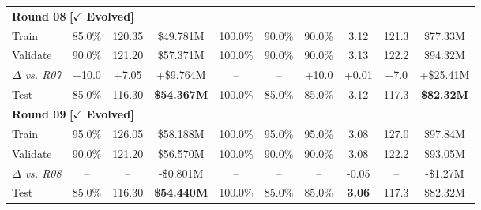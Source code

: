\begin{table}[!htb]
\begin{tabular}{l c c c c c c c c c}
\multicolumn{10}{l}{\textbf{Round 08} \textcolor{GoogleGreen!65!black}{\textbf{[$\checkmark$ Evolved]}}} \\
\quad Train                     & 85.0\% & 120.35 & \$49.781M & 100.0\% & 90.0\% & 90.0\% & 3.12 & 121.3 & \$77.33M \\
\quad Validate                  & 90.0\% & 121.20 & \$57.371M & 100.0\% & 90.0\% & 90.0\% & 3.13 & 122.2 & \$94.32M \\
\quad \quad \textcolor{black!65}{\textit{\scriptsize $\Delta$ vs. R07}} & \textcolor{GoogleGreen!65!black}{\scriptsize +10.0} & \textcolor{GoogleGreen!65!black}{\scriptsize +7.05} & \textcolor{GoogleGreen!65!black}{\scriptsize +\$9.764M} & \textcolor{black!65}{\scriptsize --} & \textcolor{black!65}{\scriptsize --} & \textcolor{GoogleGreen!65!black}{\scriptsize +10.0} & \textcolor{GoogleRed!75!black}{\scriptsize +0.01} & \textcolor{GoogleGreen!65!black}{\scriptsize +7.0} & \textcolor{GoogleGreen!65!black}{\scriptsize +\$25.41M} \\
\quad Test                      & 85.0\% & 116.30 & \textbf{\$54.367M} & 100.0\% & 85.0\% & 85.0\% & 3.12 & 117.3 & \textbf{\$82.32M} \\
\midrule

\multicolumn{10}{l}{\textbf{Round 09} \textcolor{GoogleGreen!65!black}{\textbf{[$\checkmark$ Evolved]}}} \\
\quad Train                     & 95.0\% & 126.05 & \$58.188M & 100.0\% & 95.0\% & 95.0\% & 3.08 & 127.0 & \$97.84M \\
\quad Validate                  & 90.0\% & 121.20 & \$56.570M & 100.0\% & 90.0\% & 90.0\% & 3.08 & 122.2 & \$93.05M \\
\quad \quad \textcolor{black!65}{\textit{\scriptsize $\Delta$ vs. R08}} & \textcolor{black!65}{\scriptsize --} & \textcolor{black!65}{\scriptsize --} & \textcolor{GoogleRed!75!black}{\scriptsize -\$0.801M} & \textcolor{black!65}{\scriptsize --} & \textcolor{black!65}{\scriptsize --} & \textcolor{black!65}{\scriptsize --} & \textcolor{GoogleGreen!65!black}{\scriptsize -0.05} & \textcolor{black!65}{\scriptsize --} & \textcolor{GoogleRed!75!black}{\scriptsize -\$1.27M} \\
\quad Test                      & 85.0\% & 116.30 & \textbf{\$54.440M} & 100.0\% & 85.0\% & 85.0\% & \textbf{3.06} & 117.3 & \$82.32M \\
\midrule


\end{tabular}
\end{table}
